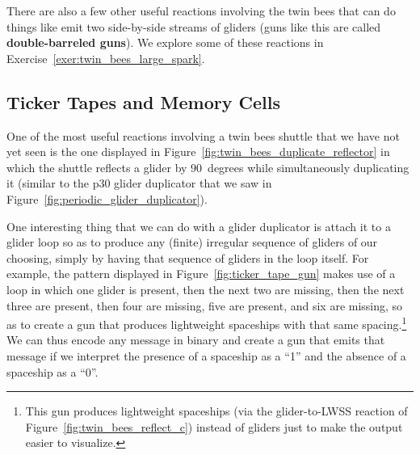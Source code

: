 There are also a few other useful reactions involving the twin bees that can do things like emit two side-by-side streams of gliders (guns like this are called \textbf{double-barreled guns}). We explore some of these reactions in Exercise~\ref{exer:twin_bees_large_spark}.


\subsection{Ticker Tapes and Memory Cells}\label{sec:p46_ticker_tape}

One of the most useful reactions involving a twin bees shuttle that we have not yet seen is the one displayed in Figure~\ref{fig:twin_bees_duplicate_reflector} in which the shuttle reflects a glider by $90$~degrees while simultaneously duplicating it (similar to the p$30$ glider duplicator that we saw in Figure~\ref{fig:periodic_glider_duplicator}).

One interesting thing that we can do with a glider duplicator is attach it to a glider loop so as to produce any (finite) irregular sequence of gliders of our choosing, simply by having that sequence of gliders in the loop itself. For example, the pattern displayed in Figure~\ref{fig:ticker_tape_gun} makes use of a loop in which one glider is present, then the next two are missing, then the next three are present, then four are missing, five are present, and six are missing, so as to create a gun that produces lightweight spaceships with that same spacing.\footnote{This gun produces lightweight spaceships (via the glider-to-LWSS reaction of Figure~\ref{fig:twin_bees_reflect_c}) instead of gliders just to make the output easier to visualize.} We can thus encode any message in binary and create a gun that emits that message if we interpret the presence of a spaceship as a ``1'' and the absence of a spaceship as a ``0''.

